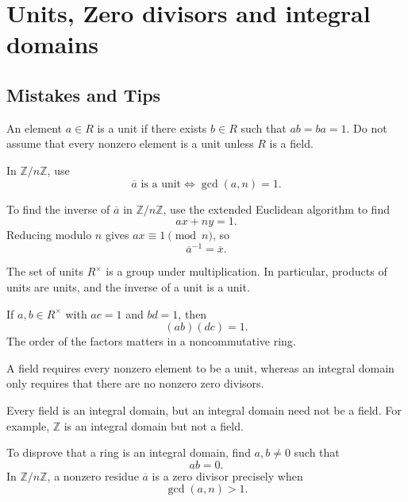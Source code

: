 \section{Units, Zero divisors and integral domains}


\subsection{Mistakes and Tips}

\begin{mistake}
  An element $a\in R$ is a unit if there exists $b\in R$ such that $ab=ba=1$. Do not assume that every nonzero element is a unit unless $R$ is a field.

  In $\mathbb{Z}/n\mathbb{Z}$, use
  \[
  \overline{a}\text{ is a unit}
  \iff \gcd(a,n)=1.
  \]
\end{mistake}

\begin{mistake}
  To find the inverse of $\overline{a}$ in $\mathbb{Z}/n\mathbb{Z}$, use the extended Euclidean algorithm to find
  \[
  ax+ny=1.
  \]
  Reducing modulo $n$ gives $ax\equiv1\pmod n$, so
  \[
  \overline{a}^{-1}=\overline{x}.
  \]
\end{mistake}

\begin{mistake}
  The set of units $R^\times$ is a group under multiplication. In particular, products of units are units, and the inverse of a unit is a unit.

  If $a,b\in R^\times$ with $ac=1$ and $bd=1$, then
  \[
  (ab)(dc)=1.
  \]
  The order of the factors matters in a noncommutative ring.
\end{mistake}

\begin{mistake}
  A field requires every nonzero element to be a unit, whereas an integral domain only requires that there are no nonzero zero divisors.

  Every field is an integral domain, but an integral domain need not be a field. For example, $\mathbb{Z}$ is an integral domain but not a field.
\end{mistake}

\begin{mistake}
  To disprove that a ring is an integral domain, find $a,b\neq0$ such that
  \[
  ab=0.
  \]
  In $\mathbb{Z}/n\mathbb{Z}$, a nonzero residue $\overline{a}$ is a zero divisor precisely when
  \[
  \gcd(a,n)>1.
  \]
\end{mistake}

